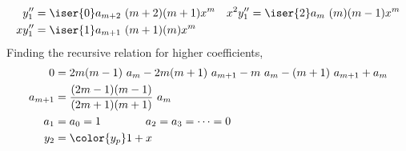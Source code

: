 \begin{enumerate}
\begin{align}
              y_1''     & = \iser{0}a_{m+2}\ (m+2)(m+1)x^{m} &
              x^2 y_1'' & = \iser{2}a_{m}\ (m)(m - 1)x^{m}     \\
              x y_1''   & = \iser{1}a_{m+1}\ (m+1)(m)x^{m}
          \end{align}
          Finding the recursive relation for higher coefficients,
          \begin{align}
              0       & = 2m(m-1)\ a_m - 2m(m+1)\ a_{m+1} - m\ a_m
              - (m+1)\ a_{m+1} + a_m                                 \\
              a_{m+1} & = \frac{(2m - 1)(m - 1)}{(2m+1)(m+1)}\ a_m   \\
              a_{1}   & = a_0 = 1 \qquad\qquad a_2 = a_3 = \dots = 0 \\
              y_2     & = \color{y_p} 1 + x
          \end{align}


\end{enumerate}
